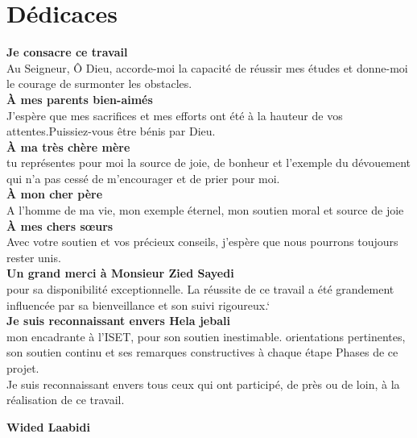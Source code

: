 \chapter*{Dédicaces}
\begin{center}
\textbf {Je consacre ce travail} \\[1em]
Au Seigneur, Ô Dieu, accorde-moi la capacité de réussir mes études et donne-moi le courage de surmonter les obstacles.\\[1em]
\textbf {À mes parents bien-aimés}\\[1em]
J'espère que mes sacrifices et mes efforts ont été à la hauteur de vos attentes.Puissiez-vous être bénis par Dieu.\\
\textbf {À ma très chère mère }\\
tu représentes pour moi la source de joie, de bonheur et l’exemple du dévouement qui n’a pas cessé de m’encourager et de prier pour moi.\\
\textbf {À mon cher père }\\
A l’homme de ma vie, mon exemple éternel, mon soutien moral et source de joie \\
 \textbf {À mes chers sœurs }\\
Avec votre soutien et vos précieux conseils, j’espère que nous pourrons toujours rester unis.\\
\textbf {Un grand merci à Monsieur Zied Sayedi}\\ 
pour sa disponibilité exceptionnelle.
La réussite de ce travail a été grandement influencée par sa bienveillance et son suivi rigoureux.`\\
\textbf{Je suis reconnaissant envers Hela jebali}\\ mon encadrante à l'ISET, pour son soutien inestimable.
orientations pertinentes, son soutien continu et ses remarques constructives à chaque étape
Phases de ce projet.\\
Je suis reconnaissant envers tous ceux qui ont participé, de près ou de loin, à la réalisation de ce travail.

\end{center}

\begin{flushright} %
\textbf{Wided Laabidi} \\[1em]

\end{flushright}